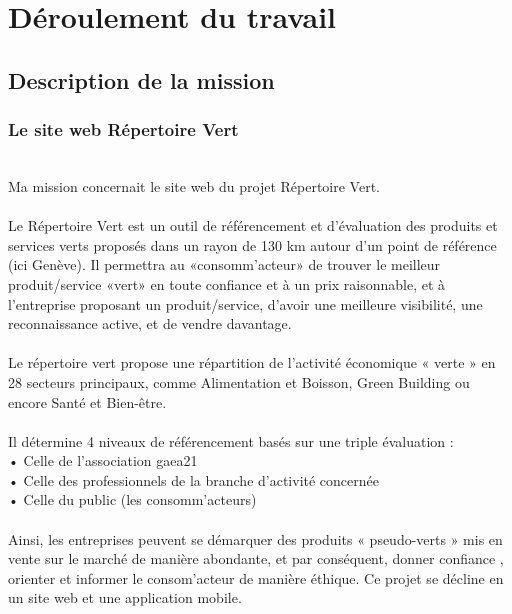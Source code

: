\section{Déroulement du travail}


\subsection{Description de la mission}

\subsubsection{Le site web Répertoire Vert}
~\\

Ma mission concernait le site web du projet Répertoire Vert.
\\\\
Le Répertoire Vert est un outil de référencement et d’évaluation des produits et services verts proposés dans un rayon de 130 km autour d’un point de référence (ici Genève). 
Il permettra au «consomm’acteur» de trouver le meilleur produit/service «vert» en toute confiance et à un prix raisonnable, 
et à l’entreprise proposant un produit/service, d’avoir une meilleure visibilité, une reconnaissance active, et de vendre davantage.
\\\\

Le répertoire vert propose une répartition de l’activité économique « verte » en 28
secteurs principaux, comme Alimentation et Boisson, Green Building ou encore Santé et Bien-être.
\\\\
Il détermine 4 niveaux de référencement basés sur une triple évaluation :\\
• Celle de l’association gaea21\\
• Celle des professionnels de la branche d’activité concernée\\
• Celle du public (les consomm’acteurs)\\
\\
Ainsi, les entreprises peuvent se démarquer des produits « pseudo-verts » mis en vente sur le marché de manière abondante, et par conséquent, donner confiance , orienter et informer le consom’acteur de manière éthique.
Ce projet se décline en un site web et une application mobile.
\\\\

